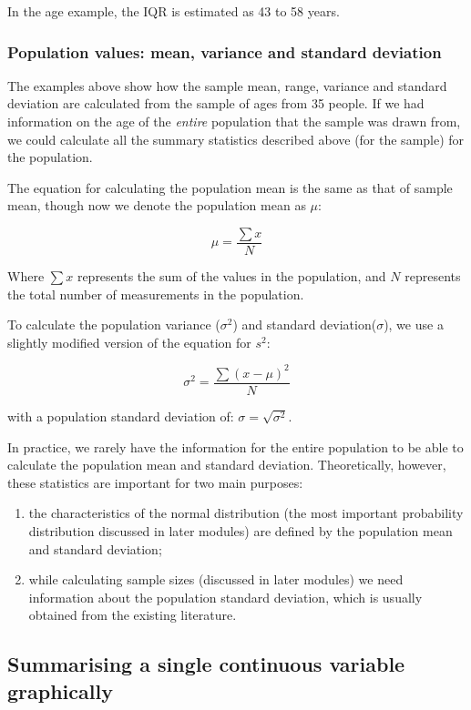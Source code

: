 \documentclass[
  a4paper,
]{memoir}
\providecommand{\tightlist}{%
  \setlength{\itemsep}{0pt}\setlength{\parskip}{0pt}}
\begin{document}
In the age example, the IQR is estimated as 43 to 58 years.

\subsubsection{Population values: mean, variance and standard
deviation}\label{population-values-mean-variance-and-standard-deviation}

The examples above show how the sample mean, range, variance and
standard deviation are calculated from the sample of ages from 35
people. If we had information on the age of the \emph{entire} population
that the sample was drawn from, we could calculate all the summary
statistics described above (for the sample) for the population.

The equation for calculating the population mean is the same as that of
sample mean, though now we denote the population mean as \(\mu\):

\[ \mu = \frac{\sum{x}}{N} \]

Where \(\sum{x}\) represents the sum of the values in the population,
and \(N\) represents the total number of measurements in the population.

To calculate the population variance (\(\sigma^2\)) and standard
deviation(\(\sigma\)), we use a slightly modified version of the
equation for \(s^2\):

\[ \sigma^2 = \frac{\sum(x - \mu)^2}{N} \]

with a population standard deviation of: \(\sigma = \sqrt{\sigma^2}\).

In practice, we rarely have the information for the entire population to
be able to calculate the population mean and standard deviation.
Theoretically, however, these statistics are important for two main
purposes:

\begin{enumerate}
\def\labelenumi{\arabic{enumi}.}
\tightlist
\item
  the characteristics of the normal distribution (the most important
  probability distribution discussed in later modules) are defined by
  the population mean and standard deviation;
\item
  while calculating sample sizes (discussed in later modules) we need
  information about the population standard deviation, which is usually
  obtained from the existing literature.
\end{enumerate}

\subsection{Summarising a single continuous variable
graphically}\label{summarising-a-single-continuous-variable-graphically}
\end{document}
